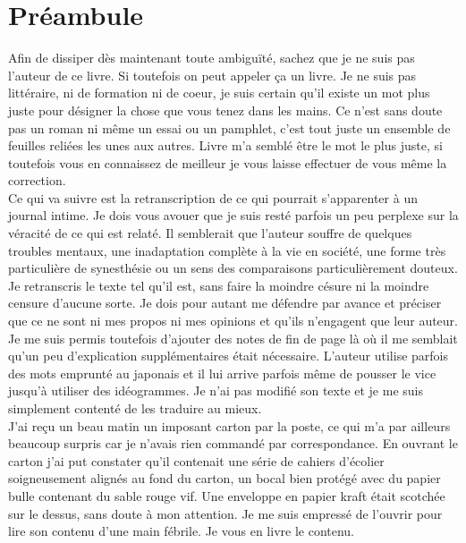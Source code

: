 \chapter{Préambule}

Afin de dissiper dès maintenant toute ambiguïté, sachez que je ne suis pas l'auteur de ce livre. Si toutefois on peut appeler ça un livre. Je ne suis pas littéraire, ni de formation ni de coeur, je suis certain qu'il existe un mot plus juste pour désigner la chose que vous tenez dans les mains. Ce n'est sans doute pas un roman ni même un essai ou un pamphlet, c'est tout juste un ensemble de feuilles reliées les unes aux autres. Livre m'a semblé être le mot le plus juste, si toutefois vous en connaissez de meilleur je vous laisse effectuer de vous même la correction. \\

Ce qui va suivre est la retranscription de ce qui pourrait s'apparenter à un journal intime. Je dois vous avouer que je suis resté parfois un peu perplexe sur la véracité de ce qui est relaté. Il semblerait que l'auteur souffre de quelques troubles mentaux, une inadaptation complète à la vie en société, une forme très particulière de synesthésie ou un sens des comparaisons particulièrement douteux.\\

Je retranscris le texte tel qu'il est, sans faire la moindre césure ni la moindre censure d'aucune sorte. Je dois pour autant me défendre par avance et préciser que ce ne sont ni mes propos ni mes opinions et qu'ils n'engagent que leur auteur. Je me suis permis toutefois d'ajouter des notes de fin de page là où il me semblait qu'un peu d'explication supplémentaires était nécessaire. L'auteur utilise parfois des mots emprunté au japonais et il lui arrive parfois même de pousser le vice jusqu'à utiliser des idéogrammes. Je n'ai pas modifié son texte et je me suis simplement contenté de les traduire au mieux.\\

J'ai reçu un beau matin un imposant carton par la poste, ce qui m'a par ailleurs beaucoup surpris car je n'avais rien commandé par correspondance. En ouvrant le carton j'ai put constater qu'il contenait une série de cahiers d'écolier soigneusement alignés au fond du carton, un bocal bien protégé avec du papier bulle contenant du sable rouge vif. Une enveloppe en papier kraft était scotchée sur le dessus, sans doute à mon attention. Je me suis empressé de l'ouvrir pour lire son contenu d'une main fébrile. Je vous en livre le contenu.\\

